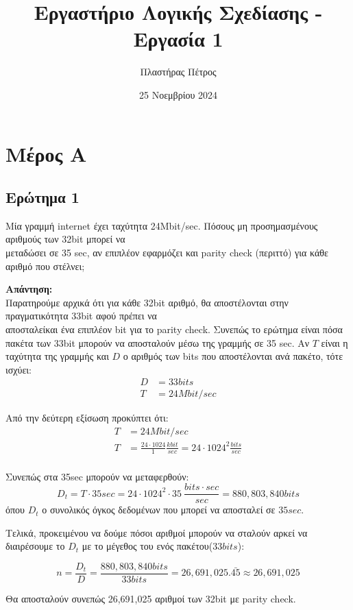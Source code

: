 \documentclass[draft]{article}
\begin{document}
\author{Πλαστήρας Πέτρος}
\title{Εργαστήριο Λογικής Σχεδίασης - Εργασία 1}
\date{25 Νοεμβρίου 2024}
\maketitle

\section{Μέρος Α}
\subsection{Ερώτημα 1}
Μία γραμμή internet έχει ταχύτητα 24Mbit/sec.
Πόσους μη προσημασμένους αριθμούς των 32bit μπορεί να \\ μεταδώσει σε 35 sec, 
αν επιπλέον εφαρμόζει και parity check (περιττό) για κάθε αριθμό που στέλνει; 

\textbf{Απάντηση: }\\
Παρατηρούμε αρχικά ότι για κάθε 32bit αριθμό, θα αποστέλονται στην πραγματικότητα 33bit αφού πρέπει να \\
αποσταλείκαι ένα επιπλέον bit για το parity check. Συνεπώς το ερώτημα είναι πόσα πακέτα των 33bit μπορούν να αποσταλούν μέσω της γραμμής σε 35 sec.
Αν $T$ είναι η ταχύτητα της γραμμής και $D$ ο αριθμός των bits που αποστέλονται ανά πακέτο, τότε ισχύει:
\begin{align*}
  D &= 33bits \\
  T &= 24Mbit/sec
\end{align*}

Από την δεύτερη εξίσωση προκύπτει ότι:
\begin{align*}
  T &= 24Mbit/sec \\
  T &= \frac{24 \cdot 1024}{1} \frac{kbit}{sec} = 24 \cdot 1024^2 \frac{bits}{sec}\\
\end{align*}

Συνεπώς στα 35sec μπορούν να μεταφερθούν:
$$
D_t = T \cdot 35sec = 24 \cdot 1024^2 \cdot 35 \ \frac{bits \cdot sec}{sec} = 880,803,840 bits
$$
όπου $D_t$ ο συνολικός όγκος δεδομένων που μπορεί να αποσταλεί σε $35sec$. 

Τελικά, προκειμένου να δούμε πόσοι αριθμοί μπορούν να σταλούν αρκεί να 
διαιρέσουμε το $D_t$ με το μέγεθος του ενός πακέτου($33bits$):

$$
n = \frac{D_t}{D} = \frac{880,803,840 bits}{33 bits} = 26,691,025.\bar{45} \approx 26,691,025
$$

Θα αποσταλούν συνεπώς 26,691,025 αριθμοί των 32bit με parity check.
\end{document}
